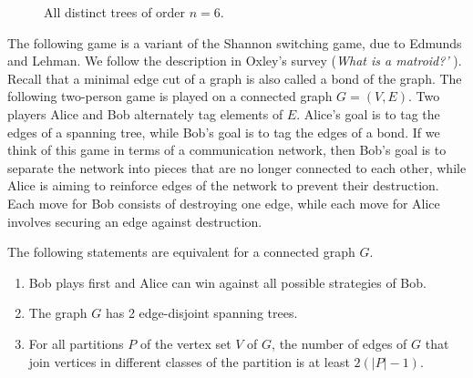 \begin{figure}[!htbp]
{
}
\quad
\caption{All distinct trees of order $n = 6$.}
\label{fig:trees_forests:distinct_trees_specified_order_6}
\end{figure}

The following game is a variant of the Shannon switching game, due to
Edmunds and Lehman. We follow the description
in Oxley's survey ({\it What is a matroid?'}
{\color{red}{add reference later}}). Recall that a minimal edge cut of
a graph is also called a bond of the graph. The following
two-person game is played on a connected graph $G = (V,E)$. Two
players Alice and Bob alternately tag elements of $E$. Alice's goal is
to tag the edges of a spanning tree, while Bob's goal is to tag the
edges of a bond. If we think of this game in terms of a communication
network, then Bob's goal is to separate the network into pieces that
are no longer connected to each other, while Alice is aiming to
reinforce edges of the network to prevent their destruction. Each move
for Bob consists of destroying one edge, while each move for Alice
involves securing an edge against destruction.

\begin{theorem}
The following statements are equivalent for a connected graph $G$.
%
\begin{enumerate}
\item Bob plays first and Alice can win against all possible
  strategies of Bob.

\item The graph $G$ has 2 edge-disjoint spanning trees.

\item For all partitions $P$ of the vertex set $V$ of $G$, the number
  of edges of $G$ that join vertices in different classes of the
  partition is at least $2(|P| - 1)$.
\end{enumerate}
\end{theorem}


